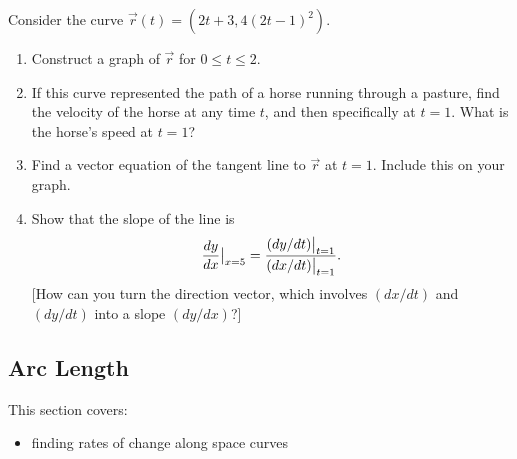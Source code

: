 \begin{problem}
Consider the curve $\vec r(t) = (2t+3, 4(2t-1)^2)$.
\begin{enumerate}
\item Construct a graph of $\vec r$ for $0\leq t\leq 2$. 
\item If this curve represented the path of a horse running through a pasture, find the velocity of the horse at any time $t$, and then specifically at $t=1$. What is the horse's speed at $t=1$?
\item Find a vector equation of the tangent line to $\vec r$ at $t=1$.  Include this on your graph.
\item Show that the slope of the line is 
$$\displaystyle \frac{dy}{dx}\big|_{x=5} 
= 
\frac{
(dy/dt)\big|_{t=1}
}{
(dx/dt)\big|_{t=1}
}.$$
[How can you turn the direction vector, which involves $(dx/dt)$ and $(dy/dt)$ into a slope $(dy/dx)$?]
\end{enumerate} 
\end{problem}
%
%

\subsection{Arc Length}\label{arc length}
This section covers:
\begin{itemize}
	\item finding rates of change along space curves
\end{itemize}

